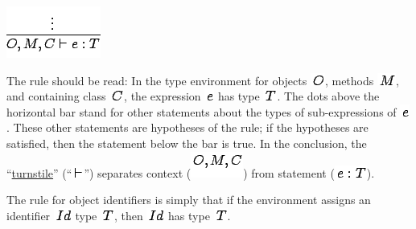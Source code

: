 \documentclass[]{article}
\begin{document}
\includegraphics{img69.png}

The rule should be read: In the type environment for objects
\includegraphics{img56.png}, methods \includegraphics{img55.png}, and
containing class \includegraphics{img61.png}, the expression
\includegraphics{img51.png} has type \includegraphics{img58.png}. The
dots above the horizontal bar stand for other statements about the types
of sub-expressions of \includegraphics{img51.png}. These other
statements are hypotheses of the rule; if the hypotheses are satisfied,
then the statement below the bar is true. In the conclusion, the
``\href{http://en.wikipedia.org/wiki/Turnstile_\%28symbol\%29}{turnstile}''
(``\includegraphics{img70.png}'') separates context
(\includegraphics{img71.png}) from statement
(\includegraphics{img72.png}).

The rule for object identifiers is simply that if the environment
assigns an identifier \includegraphics{img73.png} type
\includegraphics{img58.png}, then \includegraphics{img73.png} has type
\includegraphics{img58.png}. \\
\end{document}

